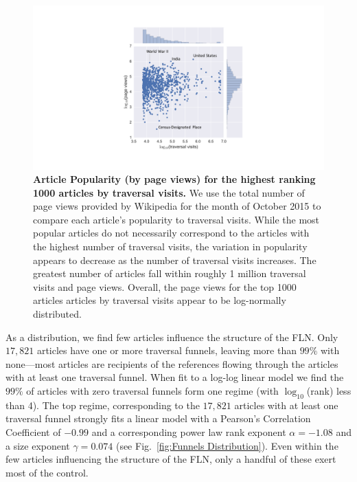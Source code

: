 \documentclass[pre,twocolumn,twoside,byrevtex,superscriptaddress,floatfix]{revtex4-1}
\begin{document}
\begin{figure}[tp!]
  \includegraphics[width=\columnwidth]{../graphics/popularity_visits.pdf}
  \caption{
\textbf{Article Popularity (by page views) for the highest ranking 1000 articles by traversal visits.}
We use the total number of page views provided by Wikipedia for the month
of October 2015 to compare each article's popularity to traversal visits.
While the most popular articles do not necessarily correspond to the articles
with the highest number of traversal visits, the variation in popularity appears to decrease as the number of traversal visits increases. The greatest number of articles fall within roughly 1 million traversal visits and page views. Overall, the page views for the top 1000 articles articles by traversal visits appear to be log-normally distributed. 
}
  \label{fig:Views and Visits}

\end{figure}
As a distribution, we find few articles influence the structure of the 
FLN. Only $17, 821$ articles have one or more traversal funnels, leaving
more than $99\%$ with none---most articles are recipients of 
the references flowing through the articles with at least one traversal funnel.
When fit to a log-log linear model we find the $99\%$ of articles with zero
traversal funnels form one regime (with $\log_{10}$(rank) less than 4).
The top regime, corresponding to the $17, 821$ articles with at least one 
traversal funnel strongly fits a linear model with
a Pearson's Correlation Coefficient of $-0.99$ and a 
corresponding power law rank exponent $\alpha = -1.08$
and a size exponent $\gamma = 0.074$ 
(see Fig.~\ref{fig:Funnels Distribution}). Even within the few articles
influencing the structure of the FLN, only a handful of these exert most of the 
control. 
\end{document}
